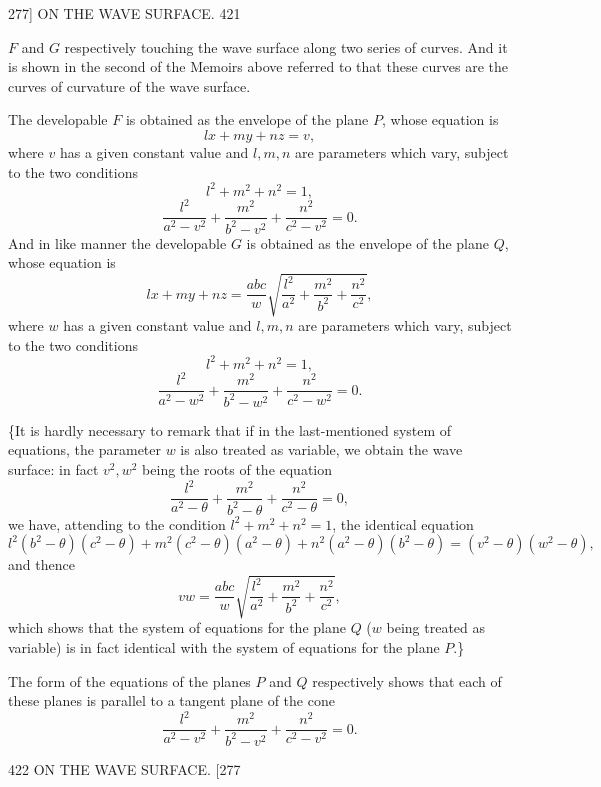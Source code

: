 \documentclass[11pt]{article}
\begin{document}
\begin{center}
\textsc{277]} \hfill ON THE WAVE SURFACE. \hfill 421
\end{center}

$F$ and $G$ respectively touching the wave surface along two series of curves. And it
is shown in the second of the Memoirs above referred to that these curves are the
curves of curvature of the wave surface.

The developable $F$ is obtained as the envelope of the plane $P$, whose equation is
\[ lx+my+nz=v, \]
where $v$ has a given constant value and $l,m,n$ are parameters which vary, subject to
the two conditions
\[ l^{2}+m^{2}+n^{2}=1, \]
\[ \frac{l^{2}}{a^{2}-v^{2}}+\frac{m^{2}}{b^{2}-v^{2}}+\frac{n^{2}}{c^{2}-v^{2}}=0. \]
And in like manner the developable $G$ is obtained as the envelope of the plane $Q$,
whose equation is
\[ lx+my+nz=\frac{abc}{w}\sqrt{\frac{l^{2}}{a^{2}}+\frac{m^{2}}{b^{2}}+\frac{n^{2}}{c^{2}}}, \]
where $w$ has a given constant value and $l,m,n$ are parameters which vary, subject
to the two conditions
\[ l^{2}+m^{2}+n^{2}=1, \]
\[ \frac{l^{2}}{a^{2}-w^{2}}+\frac{m^{2}}{b^{2}-w^{2}}+\frac{n^{2}}{c^{2}-w^{2}}=0. \]

\{It is hardly necessary to remark that if in the last-mentioned system of
equations, the parameter $w$ is also treated as variable, we obtain the wave surface:
in fact $v^{2},w^{2}$ being the roots of the equation
\[ \frac{l^{2}}{a^{2}-\theta}+\frac{m^{2}}{b^{2}-\theta}+\frac{n^{2}}{c^{2}-\theta}=0, \]
we have, attending to the condition $l^{2}+m^{2}+n^{2}=1$, the identical equation
\[ l^{2}(b^{2}-\theta)(c^{2}-\theta)+m^{2}(c^{2}-\theta)(a^{2}-\theta)+n^{2}(a^{2}-\theta)(b^{2}-\theta)=(v^{2}-\theta)(w^{2}-\theta), \]
and thence
\[ vw=\frac{abc}{w}\sqrt{\frac{l^{2}}{a^{2}}+\frac{m^{2}}{b^{2}}+\frac{n^{2}}{c^{2}}}, \]
which shows that the system of equations for the plane $Q$ ($w$ being treated as
variable) is in fact identical with the system of equations for the plane $P$.\}

The form of the equations of the planes $P$ and $Q$ respectively shows that each
of these planes is parallel to a tangent plane of the cone
\[ \frac{l^{2}}{a^{2}-v^{2}}+\frac{m^{2}}{b^{2}-v^{2}}+\frac{n^{2}}{c^{2}-v^{2}}=0. \]

\begin{center}
422 \hfill ON THE WAVE SURFACE. \hfill \textsc{[277}
\end{center}
\end{document}
